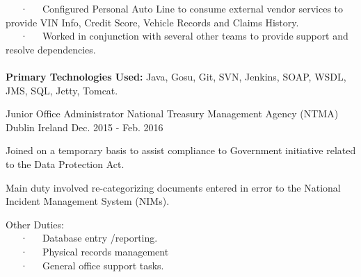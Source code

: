 \begin{cventries}
{\begin{cvitems}
{	~~~·~~~Configured Personal Auto Line to consume external vendor services to provide VIN Info, Credit Score, Vehicle Records and Claims History.  
{\\}
	~~~·~~~Worked in conjunction with several other teams to provide support and resolve dependencies. 
{\\}
{\\}
	{\textbf{Primary Technologies Used:}} Java, Gosu, Git, SVN, Jenkins, SOAP, WSDL, JMS, SQL, Jetty, Tomcat.}
      \end{cvitems}
    }
  \cventry
    {Junior Office Administrator} %
    {National Treasury Management Agency (NTMA)} %
    {Dublin Ireland} %
    {Dec. 2015 - Feb. 2016} %
    {
      \begin{cvitems} %
        \item {Joined on a temporary basis to assist compliance to Government initiative related to the Data Protection Act.}
        \item {Main duty involved re-categorizing documents entered in error to the National Incident Management System (NIMs).}
        \item {Other Duties: {\\}~~~·~~~Database entry /reporting.{\\}~~~·~~~Physical records management{\\}~~~·~~~General office support tasks. }
      \end{cvitems}
    }
\end{cventries}
